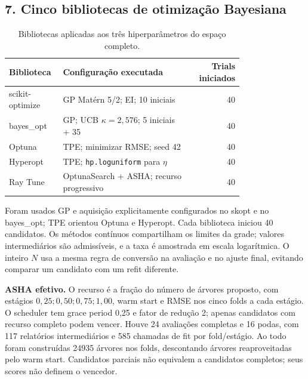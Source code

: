 \documentclass[12pt,a4paper]{article}
\begin{document}
\subsection{7. Cinco bibliotecas de otimização Bayesiana}

\begin{table}[H]
\centering
\caption{Bibliotecas aplicadas aos três hiperparâmetros do espaço completo.}
\small
\setlength{\tabcolsep}{4.5pt}
\renewcommand{\arraystretch}{1.16}
\begin{adjustbox}{max width=\linewidth}
\begin{tabular}{@{}>{\raggedright\arraybackslash}p{0.23\linewidth}>{\raggedright\arraybackslash}p{0.55\linewidth}r@{}}
\toprule
Biblioteca & Configuração executada & \shortstack[r]{Trials\\iniciados} \\
\midrule
scikit-optimize & GP Matérn 5/2; EI; 10 iniciais & 40 \\
bayes\_opt & GP; UCB $\kappa=2{,}576$; 5 iniciais + 35 & 40 \\
Optuna & TPE; minimizar RMSE; seed 42 & 40 \\
Hyperopt & TPE; \texttt{hp.loguniform} para $\eta$ & 40 \\
Ray Tune & OptunaSearch + ASHA; recurso progressivo & 40 \\
\bottomrule
\end{tabular}
\end{adjustbox}
\end{table}

Foram usados GP e aquisição explicitamente configurados no skopt\cite{skopt} e no bayes\_opt\cite{bayesopt}; TPE orientou Optuna\cite{optuna} e Hyperopt\cite{hyperopt}. Cada biblioteca iniciou 40 candidatos. Os métodos contínuos compartilham os limites da grade; valores intermediários são admissíveis, e a taxa é amostrada em escala logarítmica. O inteiro $N$ usa a mesma regra de conversão na avaliação e no ajuste final, evitando comparar um candidato com um refit diferente.

\textbf{ASHA efetivo.} O recurso é a fração do número de árvores proposto, com estágios $0{,}25;0{,}50;0{,}75;1{,}00$, warm start e RMSE nos cinco folds a cada estágio. O scheduler tem grace period 0,25 e fator de redução 2; apenas candidatos com recurso completo podem vencer\cite{ray}. Houve 24 avaliações completas e 16 podas, com 117 relatórios intermediários e 585 chamadas de fit por fold/estágio. Ao todo foram construídas 24935 árvores nos folds, descontando árvores reaproveitadas pelo warm start. Candidatos parciais não equivalem a candidatos completos; seus scores não definem o vencedor.
\end{document}
